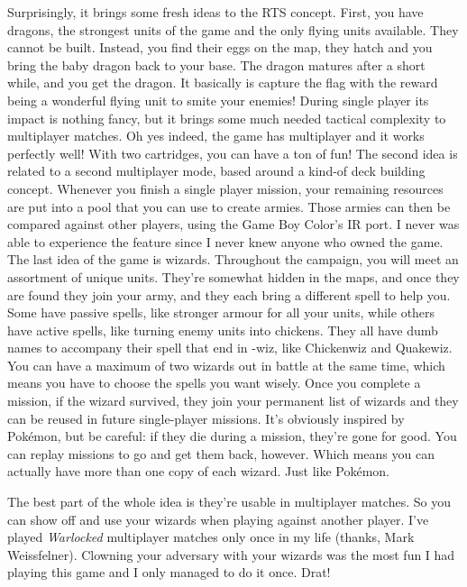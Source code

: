 \documentclass{book}
\begin{document}
Surprisingly, it brings some fresh ideas to the RTS concept. First, you have dragons, the strongest units of the game and the only flying units available. They cannot be built. Instead, you find their eggs on the map, they hatch and you bring the baby dragon back to your base. The dragon matures after a short while, and you get the dragon. It basically is capture the flag with the reward being a wonderful flying unit to smite your enemies! During single player its impact is nothing fancy, but it brings some much needed tactical complexity to multiplayer matches. Oh yes indeed, the game has multiplayer and it works perfectly well! With two cartridges, you can have a ton of fun! The second idea is related to a second multiplayer mode, based around a kind-of deck building concept. Whenever you finish a single player mission, your remaining resources are put into a pool that you can use to create armies. Those armies can then be compared against other players, using the Game Boy Color’s IR port. I never was able to experience the feature since I never knew anyone who owned the game. The last idea of the game is wizards. Throughout the campaign, you will meet an assortment of unique units. They’re somewhat hidden in the maps, and once they are found they join your army, and they each bring a different spell to help you. Some have passive spells, like stronger armour for all your units, while others have active spells, like turning enemy units into chickens. They all have dumb names to accompany their spell that end in -wiz, like Chickenwiz and Quakewiz. You can have a maximum of two wizards out in battle at the same time, which means you have to choose the spells you want wisely. Once you complete a mission, if the wizard survived, they join your permanent list of wizards and they can be reused in future single-player missions. It’s obviously inspired by Pokémon, but be careful: if they die during a mission, they’re gone for good. You can replay missions to go and get them back, however. Which means you can actually have more than one copy of each wizard. Just like Pokémon.\par
The best part of the whole idea is they’re usable in multiplayer matches. So you can show off and use your wizards when playing against another player. I’ve played \emph{Warlocked} multiplayer matches only once in my life (thanks, Mark Weissfelner). Clowning your adversary with your wizards was the most fun I had playing this game and I only managed to do it once. Drat!\par
\FloatBarrier\vspace{\baselineskip}\begin{figure}[H]\end{figure}
\end{document}

